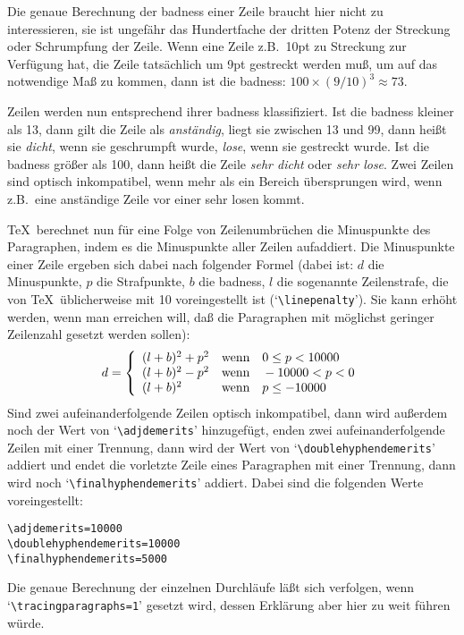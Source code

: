 Die genaue Berechnung der 
badness einer Zeile braucht hier nicht zu
interessieren, sie ist ungef\"ahr das Hundertfache der dritten
Potenz
der Streckung oder 
Schrumpfung der Zeile. Wenn eine Zeile z.B.\ 10pt
zu Streckung zur Verf\"ugung hat, die Zeile tats\"achlich um 9pt gestreckt
werden mu\ss{}, um auf das notwendige Ma\ss{} zu kommen, dann ist die badness:
$100\times (9/10)^3\approx 73$.

Zeilen werden nun entsprechend ihrer badness klassifiziert. Ist die
badness kleiner als 13, dann gilt die Zeile als {\em anst\"andig}, liegt
sie zwischen 13 und 99, dann hei\ss{}t sie {\em dicht}, wenn sie
geschrumpft wurde, {\em lose}, wenn sie gestreckt wurde. Ist die
badness gr\"o\ss{}er als 100, dann hei\ss{}t die Zeile {\em sehr dicht} oder
{\em sehr lose}. Zwei Zeilen sind optisch inkompatibel, wenn mehr als
ein Bereich \"ubersprungen wird, wenn z.B.\ eine anst\"andige Zeile vor
einer sehr losen kommt.

\TeX\ berechnet nun f\"ur eine Folge von Zeilenumbr\"uchen die
Minuspunkte
des Paragraphen, indem es die Minuspunkte aller Zeilen aufaddiert. Die
Minuspunkte einer Zeile ergeben sich dabei nach folgender
Formel
(dabei ist: $d$ die 
Minuspunkte, $p$ die Strafpunkte, $b$ die badness,
$l$ die sogenannte 
Zeilenstrafe, die von \TeX\ \"ublicherweise mit 10
voreingestellt ist 
(`\verb|\linepenalty|'). Sie kann erh\"oht werden,
wenn man erreichen will, da\ss{} die Paragraphen mit m\"oglichst geringer
Zeilenzahl gesetzt werden sollen):
\[
d=\left\{\begin{array}{ll}
(l+b)^2+p^2 & \mbox{wenn\quad} 0\leq p <10000 \\
(l+b)^2-p^2 & \mbox{wenn\quad} -10000 < p < 0 \\
(l+b)^2 & \mbox{wenn\quad} p \leq -10000 \end{array} \right. \]
Sind zwei aufeinanderfolgende Zeilen optisch inkompatibel, dann wird
au\ss{}erdem noch der Wert von 
`\verb|\adjdemerits|' hinzugef\"ugt, enden
zwei aufeinanderfolgende Zeilen mit einer Trennung, dann wird der Wert
von 
`\verb|\doublehyphendemerits|' addiert und endet die vorletzte
Zeile eines Paragraphen mit einer Trennung, dann wird noch
`\verb|\finalhyphendemerits|' addiert. Dabei sind die folgenden Werte
voreingestellt:
\begin{verbatim}
\adjdemerits=10000
\doublehyphendemerits=10000
\finalhyphendemerits=5000
\end{verbatim}
Die genaue Berechnung der einzelnen Durchl\"aufe l\"a\ss{}t sich
verfolgen, wenn
`\verb|\tracingparagraphs=1|' gesetzt wird,
dessen Erkl\"arung aber hier zu weit f\"uhren w\"urde.

